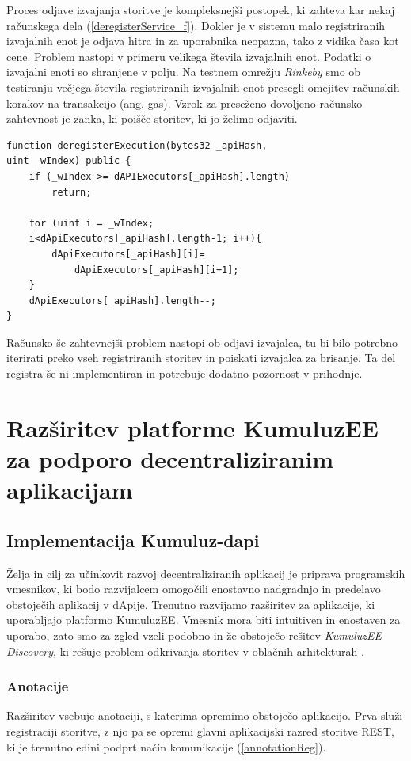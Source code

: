 \documentclass[a4paper, 12pt]{book}
\begin{document}
Proces odjave izvajanja storitve je kompleksnejši postopek, ki zahteva kar nekaj računskega dela (\ref{deregisterService_f}).
Dokler je v sistemu malo registriranih izvajalnih enot je odjava hitra in za uporabnika neopazna, tako z vidika časa kot cene.
Problem nastopi v primeru velikega števila izvajalnih enot.
Podatki o izvajalni enoti so shranjene v polju.
Na testnem omrežju \textit{Rinkeby} smo ob testiranju večjega števila registriranih izvajalnih enot presegli omejitev računskih korakov na transakcijo (ang. gas).
Vzrok za preseženo dovoljeno računsko zahtevnost je zanka, ki poišče storitev, ki jo želimo odjaviti.

\begin{lstlisting}[caption={Odjava izvajanja},captionpos=b,label={deregisterService_f}]
function deregisterExecution(bytes32 _apiHash, 
uint _wIndex) public {
	if (_wIndex >= dAPIExecutors[_apiHash].length)
		return;
	
	for (uint i = _wIndex;
	i<dApiExecutors[_apiHash].length-1; i++){
		dApiExecutors[_apiHash][i]=
			dApiExecutors[_apiHash][i+1];
	}
	dApiExecutors[_apiHash].length--;
}
\end{lstlisting}

Računsko še zahtevnejši problem nastopi ob odjavi izvajalca, tu bi bilo potrebno iterirati preko vseh registriranih storitev in poiskati izvajalca za brisanje.
Ta del registra še ni implementiran in potrebuje dodatno pozornost v prihodnje.


\section{Razširitev platforme KumuluzEE za podporo decentraliziranim aplikacijam}

\subsection{Implementacija Kumuluz-dapi}
Želja in cilj za učinkovit razvoj decentraliziranih aplikacij je priprava programskih vmesnikov, ki bodo razvijalcem omogočili enostavno nadgradnjo in predelavo obstoječih aplikacij v dApije.
Trenutno razvijamo razširitev za aplikacije, ki uporabljajo platformo KumuluzEE.
Vmesnik mora biti intuitiven in enostaven za uporabo, zato smo za zgled vzeli podobno in že obstoječo rešitev \textit{KumuluzEE Discovery}, ki rešuje problem odkrivanja storitev v oblačnih arhitekturah \cite{maldip}.

\subsubsection{Anotacije}
Razširitev vsebuje anotaciji, s katerima opremimo obstoječo aplikacijo.
Prva služi registraciji storitve, z njo pa se opremi glavni aplikacijski razred storitve REST, ki je trenutno edini podprt način komunikacije (\ref{annotationReg}).
\end{document}
